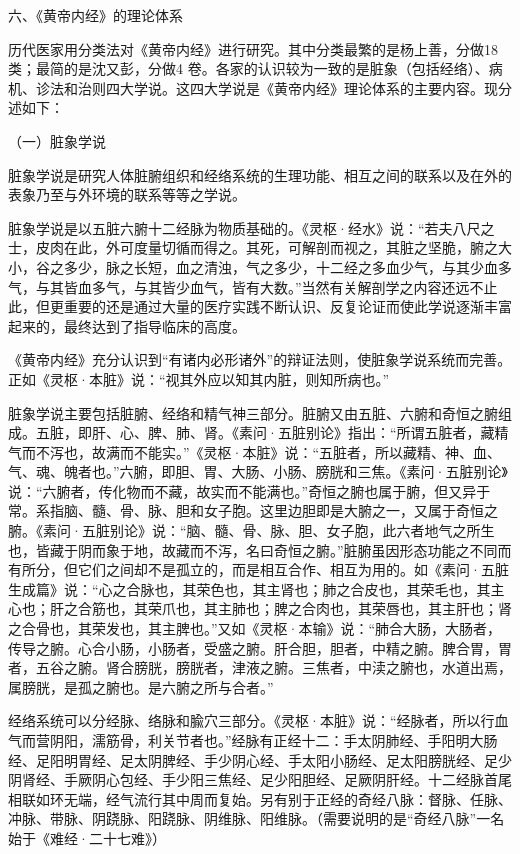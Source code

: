 \documentclass[a4paper,12pt,UTF8,twoside]{ctexbook}
\begin{document}
	六、《黄帝内经》的理论体系
	
	历代医家用分类法对《黄帝内经》进行研究。其中分类最繁的是杨上善，分做18 类；最简的是沈又彭，分做4 卷。各家的认识较为一致的是脏象（包括经络）、病机、诊法和治则四大学说。这四大学说是《黄帝内经》理论体系的主要内容。现分述如下：
	
	（一）脏象学说
	
	脏象学说是研究人体脏腑组织和经络系统的生理功能、相互之间的联系以及在外的表象乃至与外环境的联系等等之学说。
	
	脏象学说是以五脏六腑十二经脉为物质基础的。《灵枢·经水》说：“若夫八尺之士，皮肉在此，外可度量切循而得之。其死，可解剖而视之，其脏之坚脆，腑之大小，谷之多少，脉之长短，血之清浊，气之多少，十二经之多血少气，与其少血多气，与其皆血多气，与其皆少血气，皆有大数。”当然有关解剖学之内容还远不止此，但更重要的还是通过大量的医疗实践不断认识、反复论证而使此学说逐渐丰富起来的，最终达到了指导临床的高度。
	
	《黄帝内经》充分认识到“有诸内必形诸外”的辩证法则，使脏象学说系统而完善。正如《灵枢·本脏》说：“视其外应以知其内脏，则知所病也。”
	
	脏象学说主要包括脏腑、经络和精气神三部分。脏腑又由五脏、六腑和奇恒之腑组成。五脏，即肝、心、脾、肺、肾。《素问·五脏别论》指出：“所谓五脏者，藏精气而不泻也，故满而不能实。”《灵枢·本脏》说：“五脏者，所以藏精、神、血、气、魂、魄者也。”六腑，即胆、胃、大肠、小肠、膀胱和三焦。《素问·五脏别论》说：“六腑者，传化物而不藏，故实而不能满也。”奇恒之腑也属于腑，但又异于常。系指脑、髓、骨、脉、胆和女子胞。这里边胆即是大腑之一，又属于奇恒之腑。《素问·五脏别论》说：“脑、髓、骨、脉、胆、女子胞，此六者地气之所生也，皆藏于阴而象于地，故藏而不泻，名曰奇恒之腑。”脏腑虽因形态功能之不同而有所分，但它们之间却不是孤立的，而是相互合作、相互为用的。如《素问·五脏生成篇》说：“心之合脉也，其荣色也，其主肾也；肺之合皮也，其荣毛也，其主心也；肝之合筋也，其荣爪也，其主肺也；脾之合肉也，其荣唇也，其主肝也；肾之合骨也，其荣发也，其主脾也。”又如《灵枢·本输》说：“肺合大肠，大肠者，传导之腑。心合小肠，小肠者，受盛之腑。肝合胆，胆者，中精之腑。脾合胃，胃者，五谷之腑。肾合膀胱，膀胱者，津液之腑。三焦者，中渎之腑也，水道出焉，属膀胱，是孤之腑也。是六腑之所与合者。”
	
	经络系统可以分经脉、络脉和腧穴三部分。《灵枢·本脏》说：“经脉者，所以行血气而营阴阳，濡筋骨，利关节者也。”经脉有正经十二：手太阴肺经、手阳明大肠经、足阳明胃经、足太阴脾经、手少阴心经、手太阳小肠经、足太阳膀胱经、足少阴肾经、手厥阴心包经、手少阳三焦经、足少阳胆经、足厥阴肝经。十二经脉首尾相联如环无端，经气流行其中周而复始。另有别于正经的奇经八脉：督脉、任脉、冲脉、带脉、阴跷脉、阳跷脉、阴维脉、阳维脉。（需要说明的是“奇经八脉”一名始于《难经·二十七难》）
	
\end{document}

